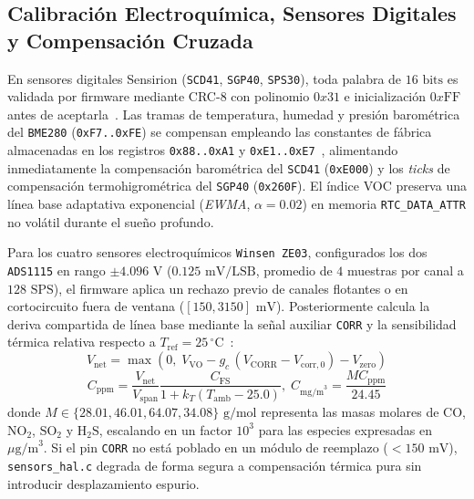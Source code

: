 \documentclass[conference]{IEEEtran}
\begin{document}
\subsection{Calibración Electroquímica, Sensores Digitales y Compensación Cruzada}

En sensores digitales Sensirion (\texttt{SCD41}, \texttt{SGP40}, \texttt{SPS30}), toda palabra de $16\text{ bits}$ es validada por firmware mediante CRC-8 con polinomio $0x31$ e inicialización $0x\text{FF}$ antes de aceptarla~\cite{sensirion2020sps30,sensirion2021scd41}. Las tramas de temperatura, humedad y presión barométrica del \texttt{BME280} (\texttt{0xF7..0xFE}) se compensan empleando las constantes de fábrica almacenadas en los registros \texttt{0x88..0xA1} y \texttt{0xE1..0xE7}~\cite{bosch2022bme280}, alimentando inmediatamente la compensación barométrica del \texttt{SCD41} (\texttt{0xE000}) y los \emph{ticks} de compensación termohigrométrica del \texttt{SGP40} (\texttt{0x260F}). El índice VOC preserva una línea base adaptativa exponencial (\emph{EWMA}, $\alpha = 0.02$) en memoria \texttt{RTC\_DATA\_ATTR} no volátil durante el sueño profundo.

Para los cuatro sensores electroquímicos \texttt{Winsen ZE03}, configurados los dos \texttt{ADS1115} en rango $\pm 4.096\text{ V}$ ($0.125\text{ mV/LSB}$, promedio de $4$ muestras por canal a $128\text{ SPS}$), el firmware aplica un rechazo previo de canales flotantes o en cortocircuito fuera de ventana ($[150, 3150]\text{ mV}$). Posteriormente calcula la deriva compartida de línea base mediante la señal auxiliar \texttt{CORR} y la sensibilidad térmica relativa respecto a $T_{\mathrm{ref}} = 25\,^\circ\text{C}$~\cite{mead2013electrochemical,winsen2019ze03}:
\begin{equation}
V_{\mathrm{net}} = \max\!\left(0,\; V_{\mathrm{VO}} - g_c\,(V_{\mathrm{CORR}} - V_{\mathrm{corr},0}) - V_{\mathrm{zero}}\right)
\label{eq:ze03_net}
\end{equation}
\begin{equation}
C_{\mathrm{ppm}} = \frac{V_{\mathrm{net}}}{V_{\mathrm{span}}}\frac{C_{\mathrm{FS}}}{1 + k_T(T_{\mathrm{amb}} - 25.0)},\;
C_{\mathrm{mg/m}^3} = \frac{M C_{\mathrm{ppm}}}{24.45}
\label{eq:ze03_conc}
\end{equation}
donde $M \in \{28.01, 46.01, 64.07, 34.08\}\text{ g/mol}$ representa las masas molares de $\text{CO}$, $\text{NO}_2$, $\text{SO}_2$ y $\text{H}_2\text{S}$, escalando en un factor $10^3$ para las especies expresadas en $\mu\text{g/m}^3$. Si el pin \texttt{CORR} no está poblado en un módulo de reemplazo ($<150\text{ mV}$), \texttt{sensors\_hal.c} degrada de forma segura a compensación térmica pura sin introducir desplazamiento espurio.
\end{document}
